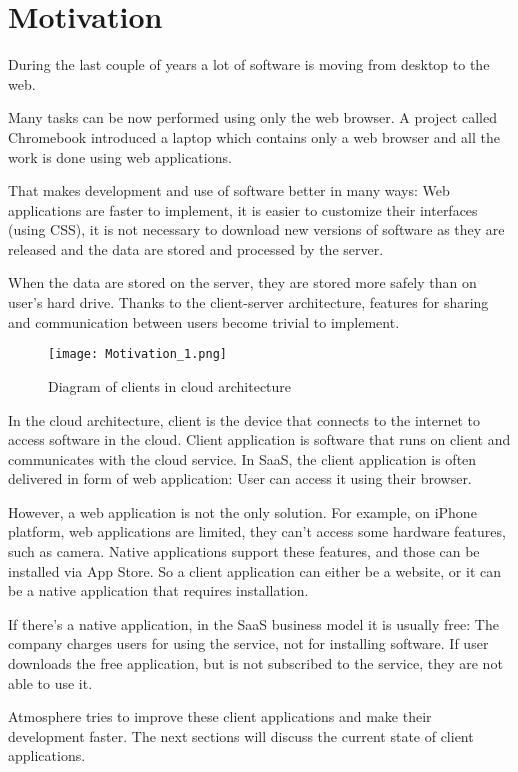 \section{Motivation}

During the last couple of years a lot of software is moving from desktop to the web.

Many tasks can be now performed using only the web browser. A project called Chromebook \citep{chromebook} introduced a laptop which contains only a web browser and all the work is done using web applications.

That makes development and use of software better in many ways: Web applications are faster to implement, it is easier to customize their interfaces (using CSS), it is not necessary to download new versions of software as they are released and the data are stored and processed by the server.

When the data are stored on the server, they are stored more safely than on user's hard drive. Thanks to the client-server architecture, features for sharing and communication between users become trivial to implement.

\begin{figure}[ht!]
\centering
\texttt{[image: Motivation\_1.png]}
\caption{Diagram of clients in cloud architecture \label{fig:1}}
\end{figure}

In the cloud architecture, client is the device that connects to the internet to access software in the cloud. Client application is software that runs on client and communicates with the cloud service. In SaaS, the client application is often delivered in form of web application: User can access it using their browser.

However, a web application is not the only solution. For example, on iPhone platform, web applications are limited, they can’t access some hardware features, such as camera. Native applications support these features, and those can be installed via App Store. So a client application can either be a website, or it can be a native application that requires installation.

If there's a native application, in the SaaS business model it is usually free: The company charges users for using the service, not for installing software. If user downloads the free application, but is not subscribed to the service, they are not able to use it.

Atmosphere tries to improve these client applications and make their development faster. The next sections will discuss the current state of client applications.

